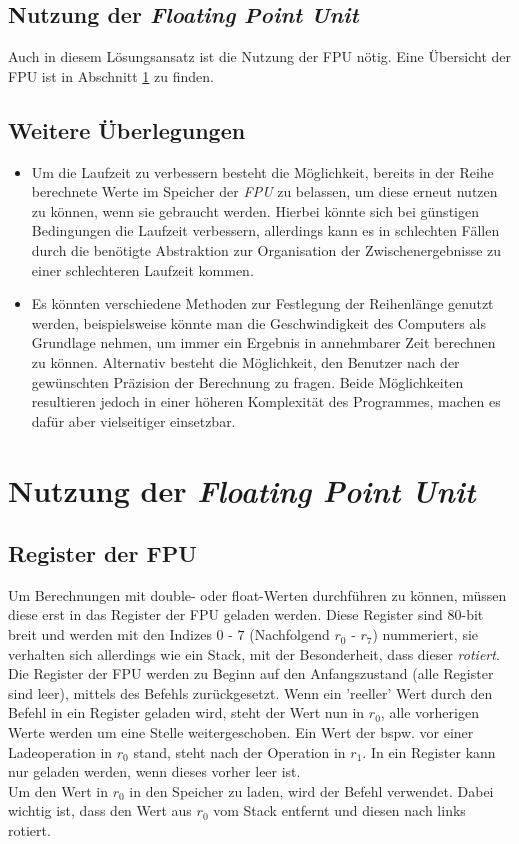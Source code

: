 \documentclass{article}
\begin{document}
	\subsection{Nutzung der \emph{Floating Point Unit}}
		Auch in diesem Lösungsansatz ist die Nutzung der FPU nötig. Eine Übersicht der FPU ist in Abschnitt \ref{sec:FPU} zu finden.
		\iffalse
			Wie benutzt man das Teil?! Kurze Übersicht, was da passieren sollte reicht wahrscheinlich
		\fi

	\subsection{Weitere Überlegungen}
		\begin{itemize}
			\item Um die Laufzeit zu verbessern besteht die Möglichkeit, bereits in der Reihe berechnete Werte im Speicher der \emph{FPU} zu belassen, um diese erneut nutzen zu können, wenn sie gebraucht werden. Hierbei könnte sich bei günstigen Bedingungen die Laufzeit verbessern, allerdings kann es in schlechten Fällen durch die benötigte Abstraktion zur Organisation der Zwischenergebnisse zu einer schlechteren Laufzeit kommen.
			\item Es könnten verschiedene Methoden zur Festlegung der Reihenlänge genutzt werden, beispielsweise könnte man die Geschwindigkeit des Computers als Grundlage nehmen, um immer ein Ergebnis in annehmbarer Zeit berechnen zu können. Alternativ besteht die Möglichkeit, den Benutzer nach der gewünschten Präzision der Berechnung zu fragen. Beide Möglichkeiten resultieren jedoch in einer höheren Komplexität des Programmes, machen es dafür aber vielseitiger einsetzbar.
		\end{itemize}

\newpage
\section{Nutzung der \emph{Floating Point Unit}}
	\label{sec:FPU}

	\subsection{Register der FPU}
		Um Berechnungen mit double- oder float-Werten durchführen zu können, müssen  diese erst in das Register der FPU geladen werden. Diese Register sind 80-bit breit und werden mit den Indizes $0$ - $7$ (Nachfolgend $r_0$ - $r_7$) nummeriert, sie verhalten sich allerdings wie ein Stack, mit der Besonderheit, dass dieser \emph{rotiert}. Die Register der FPU werden zu Beginn auf den Anfangszustand (alle Register sind leer), mittels des Befehls  zurückgesetzt. Wenn ein 'reeller' Wert durch den Befehl  in ein Register geladen wird, steht der Wert nun in $r_0$, alle vorherigen Werte werden um eine Stelle weitergeschoben. Ein Wert der bspw. vor einer Ladeoperation in $r_0$ stand, steht nach der Operation in $r_1$. In ein Register kann nur geladen werden, wenn dieses vorher leer ist.\\
		Um den Wert in $r_0$ in den Speicher zu laden, wird der Befehl  verwendet. Dabei wichtig ist, dass  den Wert aus $r_0$ vom Stack entfernt und diesen nach links rotiert.
\end{document}
